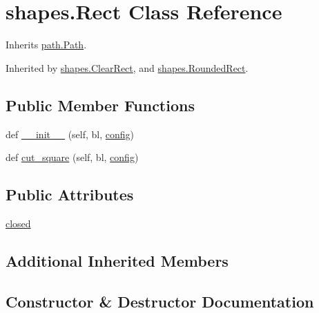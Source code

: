 \hypertarget{classshapes_1_1_rect}{}\section{shapes.\+Rect Class Reference}
\label{classshapes_1_1_rect}


Inherits \hyperlink{classpath_1_1_path}{path.\+Path}.



Inherited by \hyperlink{classshapes_1_1_clear_rect}{shapes.\+Clear\+Rect}, and \hyperlink{classshapes_1_1_rounded_rect}{shapes.\+Rounded\+Rect}.

\subsection*{Public Member Functions}
\begin{DoxyCompactItemize}
\item 
def \hyperlink{classshapes_1_1_rect_a2d448761423a1a363090ca0128019770}{\+\_\+\+\_\+init\+\_\+\+\_\+} (self, bl, \hyperlink{classpath_1_1_path_a889e352f02dba833077975ce855276ed}{config})
\item 
def \hyperlink{classshapes_1_1_rect_a6b5071a2692041a7e405a8d189204f95}{cut\+\_\+square} (self, bl, \hyperlink{classpath_1_1_path_a889e352f02dba833077975ce855276ed}{config})
\end{DoxyCompactItemize}
\subsection*{Public Attributes}
\begin{DoxyCompactItemize}
\item 
\hyperlink{classshapes_1_1_rect_ab3fc607561cc0d198df5d121219a0f7c}{closed}
\end{DoxyCompactItemize}
\subsection*{Additional Inherited Members}


\subsection{Constructor \& Destructor Documentation}
\hypertarget{classshapes_1_1_rect_a2d448761423a1a363090ca0128019770}{}
